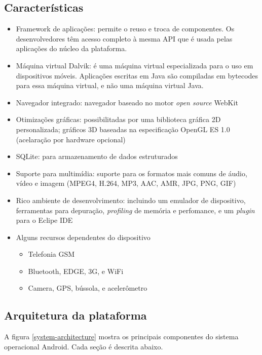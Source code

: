 \subsection{Características}
\begin{itemize}
    \item Framework de aplicações: permite o reuso e troca de componentes.
    Os desenvolvedores têm acesso completo à mesma API que é usada pelas aplicações
    do núcleo da plataforma.
    \item Máquina virtual Dalvik: é uma máquina virtual especializada para o uso em
    dispositivos móveis. Aplicações escritas em Java são compiladas em bytecodes para
    essa máquina virtual, e não uma máquina virtual Java.
    \item Navegador integrado: navegador baseado no motor {\it open source} WebKit
    \item Otimizações gráficas: possibilitadas por uma biblioteca gráfica 2D 
    personalizada; gráficos 3D baseadas na especificação OpenGL ES 1.0 (acelaração
    por hardware opcional)
    \item SQLite: para armazenamento de dados estruturados
    \item Suporte para multimídia: suporte para os formatos mais comuns de 
    áudio, vídeo e imagem (MPEG4, H.264, MP3, AAC, AMR, JPG, PNG, GIF)
    \item Rico ambiente de desenvolvimento: incluindo um emulador de dispositivo,
    ferramentas para depuração, {\it profiling} de memória e perfomance, e um {\it plugin}
    para o Eclipe IDE
    \item Alguns recursos dependentes do dispositivo
        \begin{itemize}
            \item Telefonia GSM 
            \item Bluetooth, EDGE, 3G, e WiFi
            \item Camera, GPS, bússola, e acelerômetro
        \end{itemize}
\end{itemize}

\subsection{Arquitetura da plataforma}

A figura \ref{system-architecture} mostra os principais componentes do sistema 
operacional Android. Cada seção é descrita abaixo.

